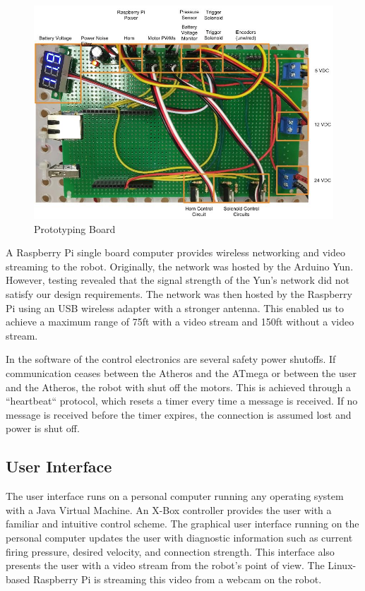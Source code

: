 \documentclass[letterpaper,12pt]{article}
\begin{document}
\begin{figure}[h!]
  \centering
  \includegraphics[width=15cm]{./pics/electronics/AnnotatedProtoboard.jpg}
  \caption{Prototyping Board}
  \label{fig:protoboard_diagram}
\end{figure}

A Raspberry Pi single board computer provides wireless networking and video
streaming to the robot. Originally, the network was hosted by the Arduino Yun.
However, testing revealed that the signal strength of the Yun's network did not satisfy
our design requirements.  The network was then hosted by the Raspberry Pi using
an USB wireless adapter with a stronger antenna. This enabled us to achieve a maximum
range of 75ft with a video stream and 150ft without a video stream.

In the software of the control electronics are several safety power shutoffs.
If communication ceases between the Atheros and the ATmega or between the user
and the Atheros, the robot with shut off the motors. This is achieved through
a “heartbeat“ protocol, which resets a timer every time a message is received.
If no message is received before the timer expires, the connection is assumed
lost and power is shut off.\\

\subsection{User Interface}
The user interface runs on a personal computer running any operating system
with a Java Virtual Machine. An X-Box controller provides the user with
a familiar and intuitive control scheme. The graphical user interface running
on the personal computer updates the user with diagnostic information such as
current firing pressure, desired velocity, and connection strength. This
interface also presents the user with a video stream from the robot’s point of
view. The Linux-based Raspberry Pi is streaming this
video from a webcam on the robot.\\
\end{document}
